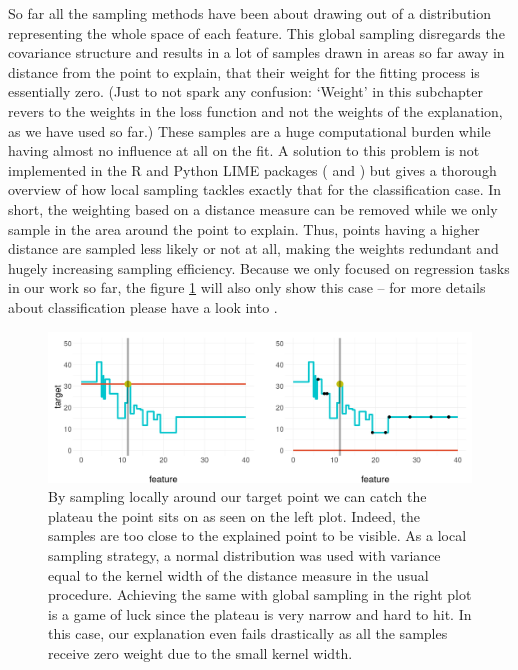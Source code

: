 \documentclass[]{krantz}
\begin{document}
So far all the sampling methods have been about drawing out of a
distribution representing the whole space of each feature. This global
sampling disregards the covariance structure and results in a lot of
samples drawn in areas so far away in distance from the point to
explain, that their weight for the fitting process is essentially zero.
(Just to not spark any confusion: `Weight' in this subchapter revers to
the weights in the loss function and not the weights of the explanation,
as we have used so far.) These samples are a huge computational burden
while having almost no influence at all on the fit. A solution to this
problem is not implemented in the R and Python LIME packages
(\citet{thomasp85lime} and \citet{marcotcrlime}) but
\citet{laugel2018defining} gives a thorough overview of how local
sampling tackles exactly that for the classification case. In short, the
weighting based on a distance measure can be removed while we only
sample in the area around the point to explain. Thus, points having a
higher distance are sampled less likely or not at all, making the
weights redundant and hugely increasing sampling efficiency. Because we
only focused on regression tasks in our work so far, the figure
\ref{fig:figlocalsampling} will also only show this case -- for more
details about classification please have a look into
\citet{laugel2018defining}.

\begin{figure}

{\centering \includegraphics[width=0.99\linewidth]{images/boston_betterVSlime_slim} 

}

\caption{By sampling locally around our target point we can catch the plateau the point sits on as seen on the left plot. Indeed, the samples are too close to the explained point to be visible. As a local sampling strategy, a normal distribution was used with variance equal to the kernel width of the distance measure in the usual procedure. Achieving the same with global sampling in the right plot is a game of luck since the plateau is very narrow and hard to hit. In this case, our explanation even fails drastically as all the samples receive zero weight due to the small kernel width.}\label{fig:figlocalsampling}
\end{figure}
\end{document}
